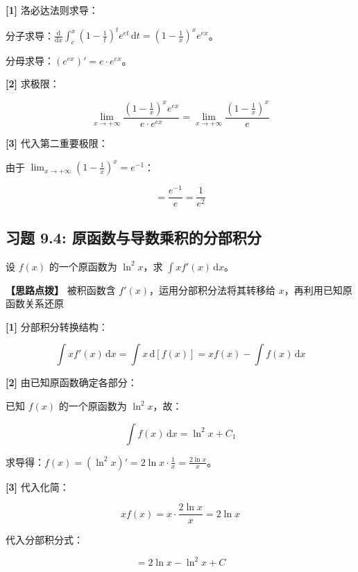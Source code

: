 \documentclass[11pt,a4paper,UTF8]{ctexart}
\begin{document}
\begin{solbox}[分步推导与答题规范]
\textbf{[1]} 洛必达法则求导：

分子求导：$\frac{\mathrm{d}}{\mathrm{d}x}\int_c^x \left(1-\frac{1}{t}\right)^t e^{et}\,\mathrm{d}t = \left(1-\frac{1}{x}\right)^x e^{ex}$。

分母求导：$(e^{ex})' = e \cdot e^{ex}$。

\textbf{[2]} 求极限：


\begin{equation*}
\lim_{x \to +\infty} \frac{\left(1-\frac{1}{x}\right)^x e^{ex}}{e \cdot e^{ex}} = \lim_{x \to +\infty} \frac{\left(1-\frac{1}{x}\right)^x}{e}
\end{equation*}


\textbf{[3]} 代入第二重要极限：

由于 $\lim_{x \to +\infty} \left(1-\frac{1}{x}\right)^x = e^{-1}$：


\begin{equation*}
= \frac{e^{-1}}{e} = \frac{1}{e^2}
\end{equation*}

\end{solbox}


\subsection{习题 9.4: 原函数与导数乘积的分部积分}

设 $f(x)$ 的一个原函数为 $\ln^2 x$，求 $\int x f'(x)\,\mathrm{d}x$。

\textbf{\color{DeepPurple}【思路点拨】} 被积函数含 $f'(x)$，运用分部积分法将其转移给 $x$，再利用已知原函数关系还原


\begin{solbox}[分步推导与答题规范]
\textbf{[1]} 分部积分转换结构：


\begin{equation*}
\int x f'(x)\,\mathrm{d}x = \int x\,\mathrm{d}[f(x)] = x f(x) - \int f(x)\,\mathrm{d}x
\end{equation*}


\textbf{[2]} 由已知原函数确定各部分：

已知 $f(x)$ 的一个原函数为 $\ln^2 x$，故：


\begin{equation*}
\int f(x)\,\mathrm{d}x = \ln^2 x + C_1
\end{equation*}


求导得：$f(x) = (\ln^2 x)' = 2\ln x \cdot \frac{1}{x} = \frac{2\ln x}{x}$。

\textbf{[3]} 代入化简：


\begin{equation*}
x f(x) = x \cdot \frac{2\ln x}{x} = 2\ln x
\end{equation*}


代入分部积分式：


\begin{equation*}
= 2\ln x - \ln^2 x + C
\end{equation*}

\end{solbox}
\end{document}
